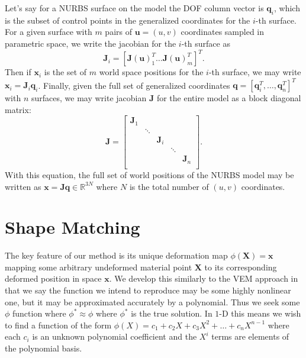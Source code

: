 Let's say for a NURBS surface on the model the DOF column vector is $\mathbf{q}_i$, which is the subset of control points in the generalized coordinates for the $i$-th surface. For a given surface with $m$ pairs of $\mathbf{u}=(u,v)$ coordinates sampled in parametric space, we write the jacobian for the $i$-th surface as 
\begin{equation}
\label{eqn:surface_jacobian}
    \mathbf{J}_i =
    \left[ \mathbf{J}(\mathbf{u})_1^T \dots \mathbf{J}(\mathbf{u})_m^T \right]^T
    \text{.}
\end{equation}
Then if $\mathbf{x}_i$ is the set of $m$ world space positions for the $i$-th surface, we may write $\mathbf{x}_i = \mathbf{J}_i \mathbf{q}_i$. Finally, given the full set of generalized coordinates $\mathbf{q} = \left[ \mathbf{q}_i^T, \dots, \mathbf{q}_n^T \right]^T$ with $n$ surfaces, we may write jacobian $\mathbf{J}$ for the entire model as a block diagonal matrix:
\begin{equation}
\mathbf{J} = \left[ \begin{array}{ccccc}
\mathbf{J}_1 &  &  &  &  \\
 & \ddots &  &  &  \\
 &  & \mathbf{J}_i & &  \\
 &  &  & \ddots &  \\
 &  &  &  & \mathbf{J}_n \\
\end{array} \right]
\text{.}
\end{equation}
With this equation, the full set of world positions of the NURBS model may be written as $\mathbf{x} = \mathbf{J}\mathbf{q} \in \mathbb{R}^{3N}$ where $N$ is the total number of $(u,v)$ coordinates.

\section{Shape Matching}
The key feature of our method is its unique deformation map $\phi(\mathbf{X}) = \mathbf{x}$ mapping some arbitrary undeformed material point $\mathbf{X}$ to its corresponding deformed position in space $\mathbf{x}$. We develop this similarly to the VEM approach in that we say the function we intend to reproduce may be some highly nonlinear one, but it may be approximated accurately by a polynomial. Thus we seek some $\phi$ function where  $\phi^* \approx \phi$ where $\phi^*$ is the true solution. In $1$-D this means we wish to find a function of the form $\phi(X) = c_1 + c_2X + c_3X^2 + \dots + c_nX^{n-1}$ where each $c_i$ is an unknown polynomial coefficient and the $X^i$ terms are elements of the polynomial basis.

